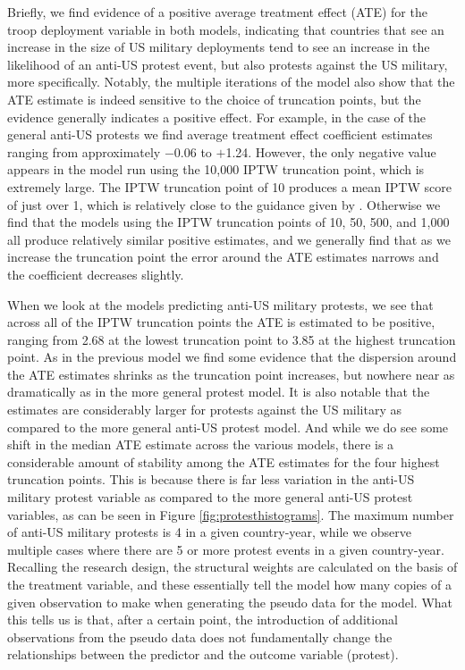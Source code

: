 Briefly, we find evidence of a positive average treatment effect (ATE) for the troop deployment variable in both models, indicating that countries that see an increase in the size of US military deployments tend to see an increase in the likelihood of an anti-US protest event, but also protests against the US military, more specifically. Notably, the multiple iterations of the model also show that the ATE estimate is indeed sensitive to the choice of truncation points, but the evidence generally indicates a positive effect. For example, in the case of the general anti-US protests we find average treatment effect coefficient estimates ranging from approximately $-$0.06 to $+$1.24. However, the only negative value appears in the model run using the 10,000 IPTW truncation point, which is extremely large. The IPTW truncation point of 10 produces a mean IPTW score of just over 1, which is relatively close to the guidance given by . Otherwise we find that the models using the IPTW truncation points of 10, 50, 500, and 1,000 all produce relatively similar positive estimates, and we generally find that as we increase the truncation point the error around the ATE estimates narrows and the coefficient decreases slightly. 

When we look at the models predicting anti-US military protests, we see that across all of the IPTW truncation points the ATE is estimated to be positive, ranging from 2.68 at the lowest truncation point to 3.85 at the highest truncation point. As in the previous model we find some evidence that the dispersion around the ATE estimates shrinks as the truncation point increases, but nowhere near as dramatically as in the more general protest model. It is also notable that the estimates are considerably larger for protests against the US military as compared to the more general anti-US protest model.  And while we do see some shift in the median ATE estimate across the various models, there is a considerable amount of stability among the ATE estimates for the four highest truncation points. This is because there is far less variation in the anti-US military protest variable as compared to the more general anti-US protest variables, as can be seen in Figure \ref{fig:protesthistograms}. The maximum number of anti-US military protests is 4 in a given country-year, while we observe multiple cases where there are 5 or more protest events in a given country-year. Recalling the research design, the structural weights are calculated on the basis of the treatment variable, and these essentially tell the model how many copies of a given observation to make when generating the pseudo data for the model. What this tells us is that, after a certain point, the introduction of additional observations from the pseudo data does not fundamentally change the relationships between the predictor and the outcome variable (protest).

